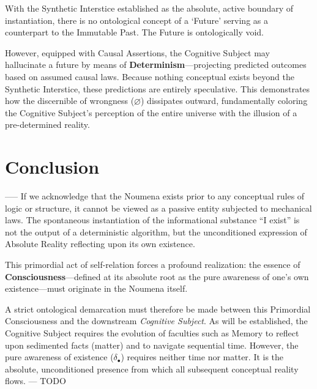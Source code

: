 \documentclass[11pt, a4paper]{article}
\theoremstyle{formalism}
\begin{document}
With the Synthetic Interstice established as the absolute, active boundary of
instantiation, there is no ontological concept of a `Future' serving as a
counterpart to the Immutable Past. The Future is ontologically void.

However, equipped with Causal Assertions, the Cognitive Subject may hallucinate
a future by means of \textbf{Determinism}---projecting predicted outcomes based
on assumed causal laws. Because nothing conceptual exists beyond the Synthetic
Interstice, these predictions are entirely speculative. This demonstrates how
the discernible of wrongness ($\varnothing$) dissipates outward, fundamentally
coloring the Cognitive Subject's perception of the entire universe with the
illusion of a pre-determined reality.

\section{Conclusion}

-----
If we acknowledge that the Noumena exists prior to any conceptual rules of
logic or structure, it cannot be viewed as a passive entity subjected to
mechanical laws. The spontaneous instantiation of the informational substance
``I exist'' is not the output of a deterministic algorithm, but the
unconditioned expression of Absolute Reality reflecting upon its own existence.

This primordial act of self-relation forces a profound realization: the essence
of \textbf{Consciousness}---defined at its absolute root as the pure awareness
of one's own existence---must originate in the Noumena itself. 

A strict ontological demarcation must therefore be made between this Primordial
Consciousness and the downstream \textit{Cognitive Subject}. As will be
established, the Cognitive Subject requires the evolution of faculties such as
Memory to reflect upon sedimented facts (matter) and to navigate sequential
time. However, the pure awareness of existence ($\delta_\bullet$) requires
neither time nor matter. It is the absolute, unconditioned presence from which
all subsequent conceptual reality flows.
---
TODO
\end{document}
